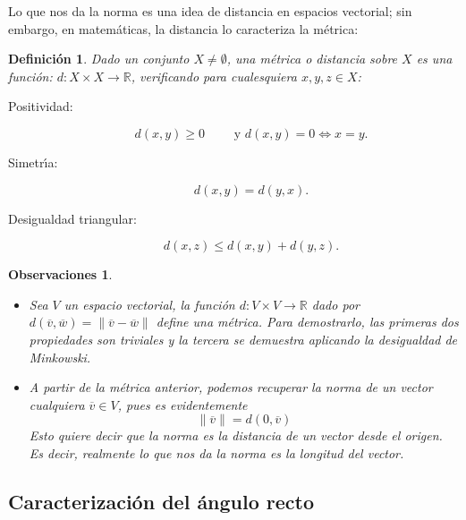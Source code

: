 \documentclass[a4paper,11pt]{article}
\theoremstyle{teoremas}
\theoremstyle{ejemplos}
\theoremstyle{definiciones}
\theoremstyle{lemas}
\newtheorem*{definicion}{Definici\'on}
\newtheorem*{observaciones}{Observaciones}
\begin{document}
Lo que nos da la norma es una idea de distancia en espacios vectorial; sin embargo, en matem\'aticas, la distancia lo caracteriza la m\'etrica:
\begin{definicion}
 Dado un conjunto $X \neq \emptyset$, una \textit{m\'etrica} o \textit{distancia} sobre $X$ es una funci\'on: $d: X \times X \rightarrow \mathbb{R}$, verificando para cualesquiera $x, y, z \in X$:
 \begin{description}
  \item[Positividad:] 
  \begin{equation}
   d(x,y) \geq 0 \qquad \text{ y } d(x,y) = 0 \Leftrightarrow x=y.
  \end{equation}

  \item[Simetr\'{\i}a:]
  \begin{equation}
   d(x,y) = d(y,x).
  \end{equation}

  \item[Desigualdad triangular:]
  \begin{equation}
   d(x,z) \leq d(x,y) + d(y,z).
  \end{equation}
 \end{description}
\end{definicion}

\begin{observaciones}
 $\phantom{0}$
 \begin{itemize}
  \item Sea $V$ un espacio vectorial, la funci\'on $d: V\times V \rightarrow \mathbb{R}$ dado por $d(\overline{v},\overline{w}) = \lVert \overline{v} -\overline{w} \rVert$ define una m\'etrica. Para demostrarlo, las primeras dos propiedades son triviales y la tercera se demuestra aplicando la desigualdad de Minkowski.
  
  \item A partir de la m\'etrica anterior, podemos recuperar la norma de un vector cualquiera $\overline{v} \in V$, pues es evidentemente
  \begin{equation}
   \lVert \overline{v} \rVert = d(0, \overline{v})
  \end{equation}
  Esto quiere decir que la norma es la distancia de un vector desde el origen. Es decir, realmente lo que nos da la norma es la longitud del vector.
 \end{itemize}
\end{observaciones}

\subsection{Caracterizaci\'on del \'angulo recto}
\end{document}
